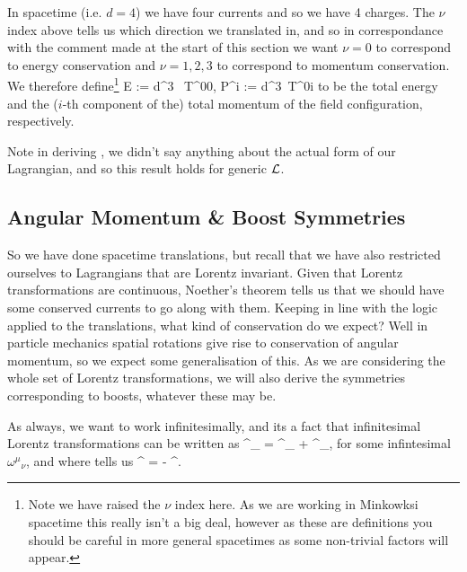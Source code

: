 In spacetime (i.e. $d=4$) we have four currents and so we have 4 charges. The $\nu$ index above tells us which direction we translated in, and so in correspondance with the comment made at the start of this section we want $\nu=0$ to correspond to energy conservation and $\nu=1,2,3$ to correspond to momentum conservation. We therefore define\footnote{Note we have raised the $\nu$ index here. As we are working in Minkowksi spacetime this really isn't a big deal, however as these are definitions you should be careful in more general spacetimes as some non-trivial factors will appear.}
\be 
\label{eqn:EnergyAndMomentumCharges}
    E := \int d^3 \, T^{00}, \qand P^i := \int d^3\, T^{0i}
\ee 
to be the total energy and the ($i$-th component of the) total momentum of the field configuration, respectively. 

\br 
    Note in deriving , we didn't say anything about the actual form of our Lagrangian, and so this result holds for generic $\mathcal{L}$.
\er 

\subsection{Angular Momentum \& Boost Symmetries}

So we have done spacetime translations, but recall that we have also restricted ourselves to Lagrangians that are Lorentz invariant. Given that Lorentz transformations are continuous, Noether's theorem tells us that we should have some conserved currents to go along with them. Keeping in line with the logic applied to the translations, what kind of conservation do we expect? Well in particle mechanics spatial rotations give rise to conservation of angular momentum, so we expect some generalisation of this. As we are considering the whole set of Lorentz transformations, we will also derive the symmetries corresponding to boosts, whatever these may be. 

As always, we want to work infinitesimally, and its a fact that infinitesimal Lorentz transformations can be written as
\bse 
    {\Lambda^{\mu}}_{\nu} = {\del^{\mu}}_{\nu} + {\omega^{\mu}}_{\nu},
\ese 
for some infintesimal ${\omega^{\mu}}_{\nu}$, and where  tells us 
\be 
\label{eqn:AntisymmetricOmega}
    \omega^{\mu\nu} = - \omega^{\nu\mu}.
\ee 

